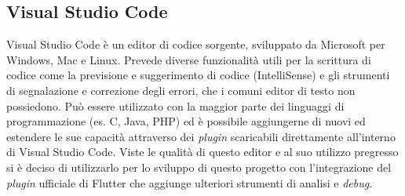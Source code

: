 \subsection{Visual Studio Code}
Visual Studio Code \cite{vsCodeSite} è un editor di codice sorgente, sviluppato da Microsoft per Windows, Mac e Linux. Prevede diverse funzionalità utili per la scrittura di codice come la previsione e suggerimento di codice (IntelliSense) e gli strumenti di segnalazione e correzione degli errori, che i comuni editor di testo non possiedono.
Può essere utilizzato con la maggior parte dei linguaggi di programmazione (es. C, Java, PHP) ed è possibile aggiungerne di nuovi ed estendere le sue capacità attraverso dei \textit{plugin} scaricabili direttamente all'interno di Visual Studio Code.
Viste le qualità di questo editor e al suo utilizzo pregresso si è deciso di utilizzarlo per lo sviluppo di questo progetto con l'integrazione del \textit{plugin} ufficiale di Flutter che aggiunge ulteriori strumenti di analisi e \textit{debug}.
